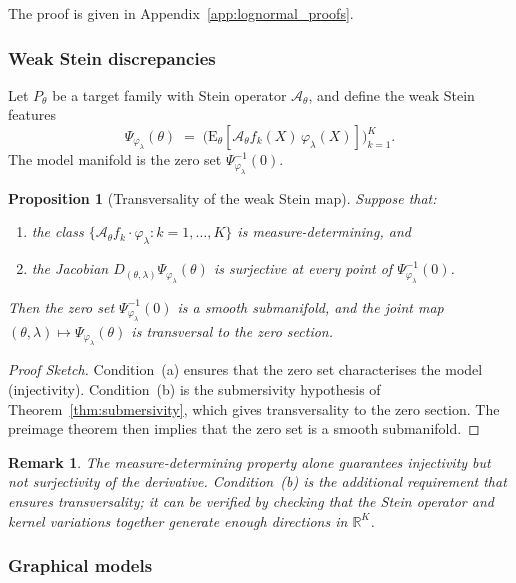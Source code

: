 \documentclass[11pt,a4paper]{article}
\newtheorem{proposition}[theorem]{Proposition}
\newtheorem{remark}[theorem]{Remark}
\newcommand{\E}{\mathrm{E}}
\newcommand{\R}{\mathbb{R}}
\begin{document}
The proof is given in Appendix~\ref{app:lognormal_proofs}.

\subsubsection{Weak Stein discrepancies}

Let $P_\theta$ be a target family with Stein operator
$\mathcal{A}_\theta$, and define the weak Stein features
\[
  \Psi_{\varphi_\lambda}(\theta)
  \;=\;
  \bigl(
  \E_\theta[\mathcal{A}_\theta f_k(X)\,\varphi_\lambda(X)]
  \bigr)_{k=1}^{K}.
\]
The model manifold is the zero set
$\Psi_{\varphi_\lambda}^{-1}(0)$.

\begin{proposition}[Transversality of the weak Stein map]
\label{prop:stein_transversality}
Suppose that:
\begin{enumerate}[label=\textnormal{(\alph*)}]
\item the class
  $\{\mathcal{A}_\theta f_k \cdot \varphi_\lambda :
  k=1,\ldots,K\}$
  is measure-determining, and
\item the Jacobian
  $D_{(\theta,\lambda)}\Psi_{\varphi_\lambda}(\theta)$ is
  surjective at every point of
  $\Psi_{\varphi_\lambda}^{-1}(0)$.
\end{enumerate}
Then the zero set $\Psi_{\varphi_\lambda}^{-1}(0)$ is a smooth
submanifold, and the joint map $(\theta,\lambda) \mapsto
\Psi_{\varphi_\lambda}(\theta)$ is transversal to the zero section.
\end{proposition}

\begin{proof}[Proof Sketch]
Condition~(a) ensures that the zero set characterises the model
(injectivity).  Condition~(b) is the submersivity hypothesis of
Theorem~\ref{thm:submersivity}, which gives transversality to the
zero section.  The preimage theorem then implies that the zero set
is a smooth submanifold.
\end{proof}

\begin{remark}
The measure-determining property alone guarantees injectivity but
not surjectivity of the derivative.  Condition~(b) is the
additional requirement that ensures transversality;
it can be verified by checking that the Stein operator and kernel
variations together generate enough directions in $\R^K$.
\end{remark}

\subsubsection{Graphical models}
\end{document}
